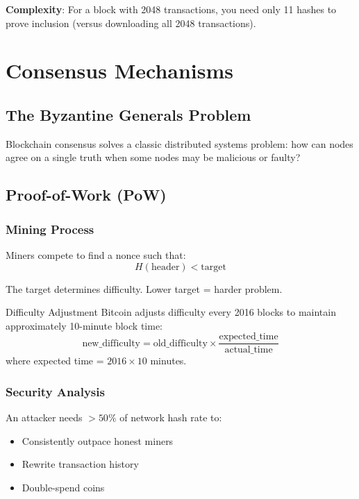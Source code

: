\documentclass[11pt,a4paper]{article}
\begin{document}
\textbf{Complexity}: For a block with 2048 transactions, you need only 11 hashes to prove inclusion (versus downloading all 2048 transactions).

\section{Consensus Mechanisms}

\subsection{The Byzantine Generals Problem}

Blockchain consensus solves a classic distributed systems problem: how can nodes agree on a single truth when some nodes may be malicious or faulty?

\subsection{Proof-of-Work (PoW)}

\subsubsection{Mining Process}

Miners compete to find a nonce such that:
\[
H(\text{header}) < \text{target}
\]

The target determines difficulty. Lower target = harder problem.

\begin{keybox}{Difficulty Adjustment}
Bitcoin adjusts difficulty every 2016 blocks to maintain approximately 10-minute block time:
\[
\text{new\_difficulty} = \text{old\_difficulty} \times \frac{\text{expected\_time}}{\text{actual\_time}}
\]
where expected time = $2016 \times 10$ minutes.
\end{keybox}

\subsubsection{Security Analysis}

An attacker needs $>50\%$ of network hash rate to:
\begin{itemize}
  \item Consistently outpace honest miners
  \item Rewrite transaction history
  \item Double-spend coins
\end{itemize}
\end{document}
